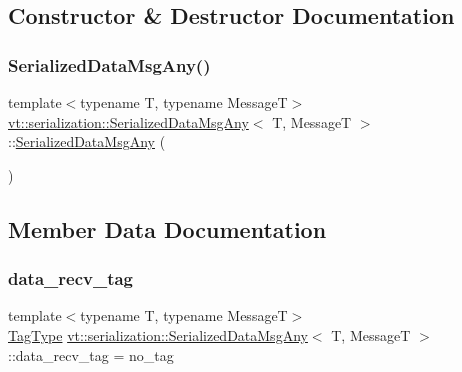 \subsection{Constructor \& Destructor Documentation}
\mbox{\label{structvt_1_1serialization_1_1_serialized_data_msg_any_abeedde83aef6f281849634198e997a78}} 
\subsubsection{\texorpdfstring{Serialized\+Data\+Msg\+Any()}{SerializedDataMsgAny()}}
{\footnotesize\ttfamily template$<$typename T, typename MessageT$>$ \\
\hyperlink{structvt_1_1serialization_1_1_serialized_data_msg_any}{vt\+::serialization\+::\+Serialized\+Data\+Msg\+Any}$<$ T, MessageT $>$\+::\hyperlink{structvt_1_1serialization_1_1_serialized_data_msg_any}{Serialized\+Data\+Msg\+Any} (\begin{DoxyParamCaption}{ }\end{DoxyParamCaption})\hspace{0.3cm}{\ttfamily [default]}}



\subsection{Member Data Documentation}
\mbox{\label{structvt_1_1serialization_1_1_serialized_data_msg_any_af731100b67b3186dbb76fbcff39be3f0}} 
\subsubsection{\texorpdfstring{data\+\_\+recv\+\_\+tag}{data\_recv\_tag}}
{\footnotesize\ttfamily template$<$typename T, typename MessageT$>$ \\
\hyperlink{namespacevt_a84ab281dae04a52a4b243d6bf62d0e52}{Tag\+Type} \hyperlink{structvt_1_1serialization_1_1_serialized_data_msg_any}{vt\+::serialization\+::\+Serialized\+Data\+Msg\+Any}$<$ T, MessageT $>$\+::data\+\_\+recv\+\_\+tag = no\+\_\+tag}

